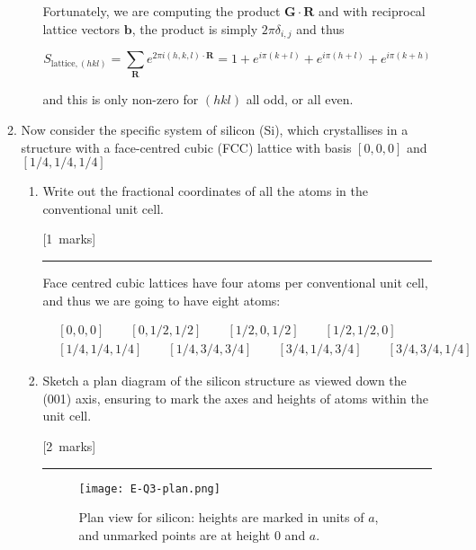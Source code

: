 \documentclass[12pt,a4paper]{article}
\newcommand{\sepline}[0]{\par \hfil\rule{10cm}{0.4pt} \vspace*{\parskip}\hfil}
\begin{document}
\begin{enumerate}
\begin{enumerate}
\begin{enumerate}
\begin{answer}
							Fortunately, we are computing the product $\mathbf{G}\cdot\mathbf{R}$ and with reciprocal lattice vectors $\mathbf{b}$, the product is simply $2\pi \delta_{i,j}$ and thus

							$$
							S_{\mathrm{lattice}, (hkl)} = \sum_\mathbf{R} e^{2\pi i (h,k,l)\cdot \mathbf{R}} = 1 + e^{i\pi(k+l)} + e^{i\pi(h+l)} + e^{i\pi(k+h)}
							$$

							and this is only non-zero for $(hkl)$ all odd, or all even.

						\end{answer}

					\end{enumerate}

					\item	Now consider the specific system of silicon (Si), which crystallises in a structure with a face-centred cubic (FCC) lattice with basis $[0,0,0]$ and $[1/4, 1/4, 1/4]$

					\begin{enumerate}
						\item Write out the fractional coordinates of all the atoms in the conventional unit cell.

						\hfill{[1~marks]}

						\begin{answer}

							\sepline

							Face centred cubic lattices have four atoms per conventional unit cell, and thus we are going to have eight atoms:

							\begin{align*}
								& [0,0,0] \qquad [0, 1/2, 1/2] \qquad [1/2, 0, 1/2] \qquad [1/2, 1/2, 0] \\
								& [1/4,1/4,1/4] \qquad [1/4, 3/4, 3/4] \qquad [3/4, 1/4, 3/4] \qquad [3/4, 3/4, 1/4]
							\end{align*}
						\end{answer}


						\item Sketch a plan diagram of the silicon structure as viewed down the (001) axis, ensuring to mark the axes and heights of atoms within the unit cell.

						\hfill{[2~marks]}

						\begin{answer}

						\sepline

						\begin{figure}[h]
							\centering
							\texttt{[image: E-Q3-plan.png]}
							\caption{Plan view for silicon: heights are marked in units of $a$, and unmarked points are at height $0$ and $a$.}
						\end{figure}


\end{answer}
\end{enumerate}
\end{enumerate}
\end{enumerate}
\end{document}

